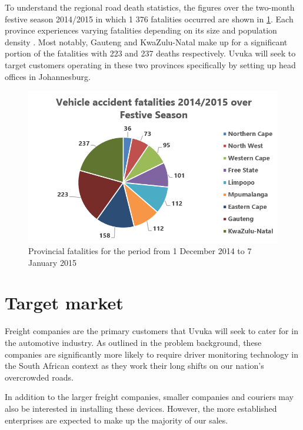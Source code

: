 To understand the regional road death statistics, the figures over the two-month festive season 2014/2015 in which 1 376 fatalities occurred are shown in \cref{fig:festiveSeason}. Each province experiences varying fatalities depending on its size and population density \cite{ProvincialFestiveStats}. Most notably, Gauteng and KwaZulu-Natal make up for a significant portion of the fatalities with 223 and 237 deaths respectively. Uvuka will seek to target customers operating in these two provinces specifically by setting up head offices in Johannesburg.

\begin{figure}[H]
\centering
\includegraphics[width=1\textwidth]{images/provincial_fatalities.PNG}
\vskip10pt
\caption[Provincial fatalities for the period from 1 December 2014 to 7 January 2015]{Provincial fatalities for the period from 1 December 2014 to 7 January 2015}
\label{fig:festiveSeason}
\end{figure}

\section{Target market}
Freight companies are the primary customers that Uvuka will seek to cater for in the automotive industry. As outlined in the problem background, these companies are significantly more likely to require driver monitoring technology in the South African context as they work their long shifts on our nation's overcrowded roads.

In addition to the larger freight companies, smaller companies and couriers may also be interested in installing these devices. However, the more established enterprises are expected to make up the majority of our sales.

